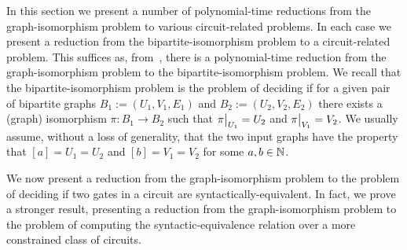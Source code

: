 \documentclass[../paper.tex]{subfiles}
\begin{document}
\begin{remark}
  In this section we present a number of polynomial-time reductions from the
  graph-isomorphism problem to various circuit-related problems. In each case we
  present a reduction from the bipartite-isomorphism problem to a
  circuit-related problem. This suffices as, from~\cite{Zemlyachenko1985}, there
  is a polynomial-time reduction from the graph-isomorphism problem to the
  bipartite-isomorphism problem. We recall that the bipartite-isomorphism
  problem is the problem of deciding if for a given pair of bipartite graphs
  $B_1 := (U_1, V_1, E_1)$ and $B_2 := (U_2, V_2, E_2)$ there exists a (graph)
  isomorphism $\pi : B_1 \rightarrow B_2$ such that $\restr{\pi}{U_1} = U_2$ and
  $\restr{\pi}{V_1} = V_2$. We usually assume, without a loss of generality,
  that the two input graphs have the property that $[a] = U_1 = U_2$ and $[b] =
  V_1 = V_2$ for some $a,b \in \mathbb{N}$.
\end{remark}

We now present a reduction from the graph-isomorphism problem to the problem of
deciding if two gates in a circuit are syntactically-equivalent. In fact, we
prove a stronger result, presenting a reduction from the graph-isomorphism
problem to the problem of computing the syntactic-equivalence relation over a
more constrained class of circuits.
\end{document}
